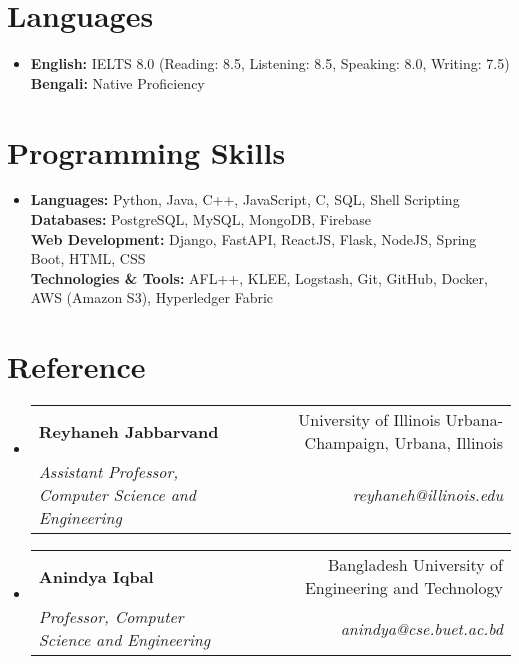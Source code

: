 \documentclass[letterpaper,12pt]{article} %
\makeatletter
\newcommand{\resumeItem}[1]{
  \item\small{
    {#1 \vspace{-2pt}}
  }
}
\newcommand{\resumeSubheading}[4]{
  \vspace{-2pt}\item
    \begin{tabular*}{0.97\textwidth}[t]{l@{\extracolsep{\fill}}r}
      \textbf{#1} & #2 \\
      \textit{\small#3} & \textit{\small #4} \\
    \end{tabular*}\vspace{-7pt}
}
\newcommand{\resumeSubHeadingListStart}{\begin{itemize}[leftmargin=0.15in, label={}]}
\newcommand{\resumeSubHeadingListEnd}{\end{itemize}}
\newcommand{\resumeItemListStart}{\begin{itemize}}
\newcommand{\resumeItemListEnd}{\end{itemize}\vspace{-5pt}}
\makeatother
\begin{document}

\section{Languages}
\begin{itemize}[leftmargin=0.15in, label={}]
    \item \textbf{English:}  IELTS 8.0 (Reading: 8.5, Listening: 8.5, Speaking: 8.0, Writing: 7.5)\\
    \textbf{Bengali:} Native Proficiency
\end{itemize}

\section{Programming Skills}
\begin{itemize}[leftmargin=0.15in, label={}]
    \item \color[HTML]{1C033C}\textbf{Languages:} Python, Java, C++, JavaScript, C, SQL, Shell Scripting\\
    \color[HTML]{1C033C}\textbf{Databases:} PostgreSQL, MySQL, MongoDB, Firebase\\
    \color[HTML]{1C033C}\textbf{Web Development:} Django, FastAPI, ReactJS, Flask, NodeJS, Spring Boot, HTML, CSS\\
    \color[HTML]{1C033C}\textbf{Technologies \& Tools:} AFL++, KLEE, Logstash, Git, GitHub, Docker, AWS (Amazon S3), Hyperledger Fabric
\end{itemize}
\section{Reference}
\resumeSubHeadingListStart
    \resumeSubheading
        {Reyhaneh Jabbarvand}{University of Illinois Urbana-Champaign, Urbana, Illinois}
        {Assistant Professor, Computer Science and Engineering}{reyhaneh@illinois.edu}
    \resumeSubheading
        {Anindya Iqbal}{Bangladesh University of Engineering and Technology}
        {Professor, Computer Science and Engineering}{anindya@cse.buet.ac.bd}
\resumeSubHeadingListEnd
\end{document}
